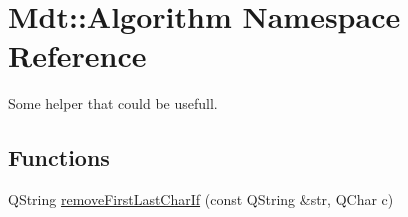 \hypertarget{namespace_mdt_1_1_algorithm}{}\section{Mdt\+:\+:Algorithm Namespace Reference}
\label{namespace_mdt_1_1_algorithm}


Some helper that could be usefull.  


\subsection*{Functions}
\begin{DoxyCompactItemize}
\item 
Q\+String \hyperlink{namespace_mdt_1_1_algorithm_a0a56e72bba54740c5dc83b59ea1c2d91}{remove\+First\+Last\+Char\+If} (const Q\+String \&str, Q\+Char c)\hypertarget{namespace_mdt_1_1_algorithm_a0a56e72bba54740c5dc83b59ea1c2d91}{}\label{namespace_mdt_1_1_algorithm_a0a56e72bba54740c5dc83b59ea1c2d91}


\end{DoxyCompactItemize}
